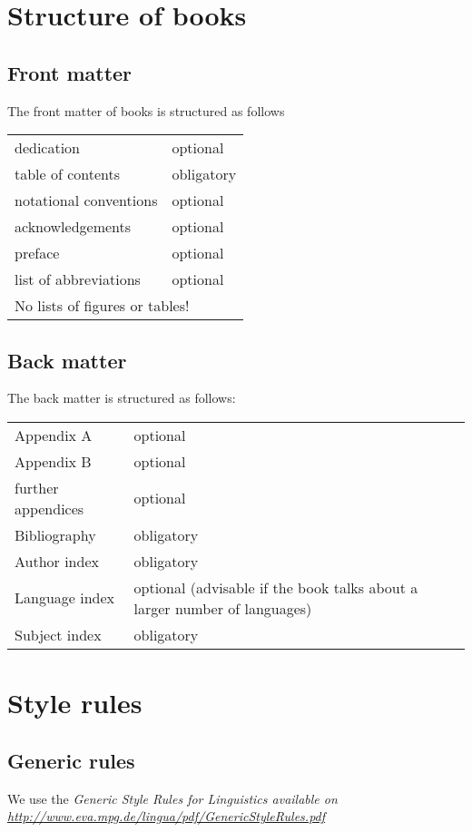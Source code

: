 \chapter{Structure of books}

\section{Front matter}

The front matter of \lsp books is structured as follows
\begin{table}[h]
\begin{tabular}{p{4cm}p{6cm}}
 dedication & optional\\
table of contents & obligatory\\
notational conventions & optional\\
acknowledgements & optional\\
preface & optional\\
list of abbreviations & optional\\
\multicolumn{2}{l}{No lists of figures or tables!}\\
\end{tabular}
\end{table}
\section{Back matter}
The back matter is structured as follows:
\begin{table}[h]
\begin{tabular}{p{4cm}p{6cm}}
 Appendix A & optional \\
 Appendix B & optional \\
 further appendices & optional \\
 Bibliography & obligatory \\
 Author index & obligatory \\
 Language index  & optional (advisable if the book talks about a larger number of languages)\\
 Subject index & obligatory \\
\end{tabular}
 \end{table}


\chapter{Style rules}
\section{Generic rules}
We use the \em Generic Style Rules for Linguistics \em available on \url{http://www.eva.mpg.de/lingua/pdf/GenericStyleRules.pdf}

